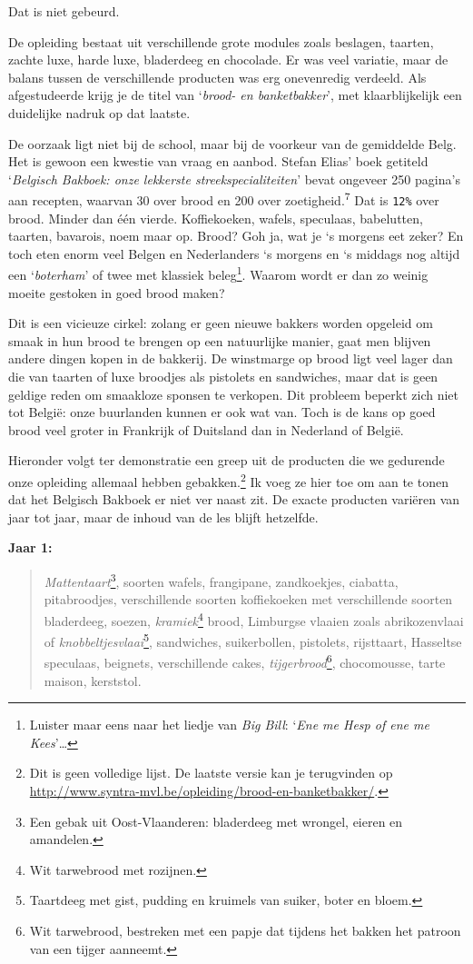 \documentclass[
  11pt,
  dutch,
]{memoir}
\begin{document}
Dat is niet gebeurd.

De opleiding bestaat uit verschillende grote modules zoals beslagen,
taarten, zachte luxe, harde luxe, bladerdeeg en chocolade. Er was veel
variatie, maar de balans tussen de verschillende producten was erg
onevenredig verdeeld. Als afgestudeerde krijg je de titel van
`\emph{brood- en banketbakker}', met klaarblijkelijk een duidelijke
nadruk op dat laatste.

De oorzaak ligt niet bij de school, maar bij de voorkeur van de
gemiddelde Belg. Het is gewoon een kwestie van vraag en aanbod. Stefan
Elias' boek getiteld `\emph{Belgisch Bakboek: onze lekkerste
streekspecialiteiten}' bevat ongeveer 250 pagina's aan recepten, waarvan
30 over brood en 200 over zoetigheid.\textsuperscript{7} Dat is
\texttt{12\%} over brood. Minder dan één vierde. Koffiekoeken, wafels,
speculaas, babelutten, taarten, bavarois, noem maar op. Brood? Goh ja,
wat je `s morgens eet zeker? En toch eten enorm veel Belgen en
Nederlanders `s morgens en `s middags nog altijd een `\emph{boterham}'
of twee met klassiek beleg\footnote{Luister maar eens naar het liedje
  van \emph{Big Bill}: `\emph{Ene me Hesp of ene me Kees}'\ldots{}}.
Waarom wordt er dan zo weinig moeite gestoken in goed brood maken?

Dit is een vicieuze cirkel: zolang er geen nieuwe bakkers worden
opgeleid om smaak in hun brood te brengen op een natuurlijke manier,
gaat men blijven andere dingen kopen in de bakkerij. De winstmarge op
brood ligt veel lager dan die van taarten of luxe broodjes als pistolets
en sandwiches, maar dat is geen geldige reden om smaakloze sponsen te
verkopen. Dit probleem beperkt zich niet tot België: onze buurlanden
kunnen er ook wat van. Toch is de kans op goed brood veel groter in
Frankrijk of Duitsland dan in Nederland of België.

Hieronder volgt ter demonstratie een greep uit de producten die we
gedurende onze opleiding allemaal hebben gebakken.\footnote{Dit is geen
  volledige lijst. De laatste versie kan je terugvinden op
  \url{http://www.syntra-mvl.be/opleiding/brood-en-banketbakker/}.} Ik
voeg ze hier toe om aan te tonen dat het Belgisch Bakboek er niet ver
naast zit. De exacte producten variëren van jaar tot jaar, maar de
inhoud van de les blijft hetzelfde.

\textbf{Jaar 1:}

\begin{quote}
\emph{Mattentaart}\footnote{Een gebak uit Oost-Vlaanderen: bladerdeeg
  met wrongel, eieren en amandelen.}, soorten wafels, frangipane,
zandkoekjes, ciabatta, pitabroodjes, verschillende soorten koffiekoeken
met verschillende soorten bladerdeeg, soezen, \emph{kramiek}\footnote{Wit
  tarwebrood met rozijnen.} brood, Limburgse vlaaien zoals
abrikozenvlaai of \emph{knobbeltjesvlaai}\footnote{Taartdeeg met gist,
  pudding en kruimels van suiker, boter en bloem.}, sandwiches,
suikerbollen, pistolets, rijsttaart, Hasseltse speculaas, beignets,
verschillende cakes, \emph{tijgerbrood}\footnote{Wit tarwebrood,
  bestreken met een papje dat tijdens het bakken het patroon van een
  tijger aanneemt.}, chocomousse, tarte maison, kerststol.
\end{quote}
\end{document}
